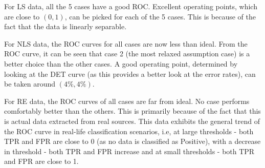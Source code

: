 \documentclass[11pt]{article}
\begin{document}
For LS data, all the 5 cases have a good ROC. Excellent operating points, which are close to $(0,1)$, can be picked for each of the 5 cases. This is because of the fact that the data is linearly separable.

For NLS data, the ROC curves for all cases are now less than ideal. From the ROC curve, it can be seen that case 2 (the most relaxed assumption case) is a better choice than the other cases. A good operating point, determined by looking at the DET curve (as this provides a better look at the error rates), can be taken around $(4\%, 4\%)$.

For RE data, the ROC curves of all cases are far from ideal. No case performs comfortably better than the others. This is primarily because of the fact that this is actual data extracted from real sources. This data exhibits the general trend of the ROC curve in real-life classification scenarios, i.e, at large thresholds - both TPR and FPR are close to 0 (as no data is classified as Positive), with a decrease in threshold - both TPR and FPR increase and at small thresholds - both TPR and FPR are close to 1. 
\end{document}
